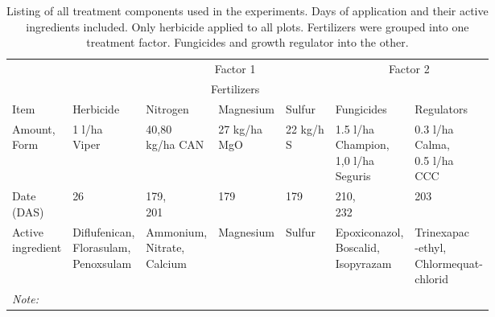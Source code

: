 \documentclass[twoside,12pt,final]{ucthesis-CA2012}
\begin{document}
\begin{ucmainmatter}
\begin{table}
\caption{\label{tab:Trt}Listing of all treatment components used in the experiments. Days of application and their active ingredients included. Only herbicide applied to all plots. Fertilizers were grouped into one treatment factor. Fungicides and growth regulator into the other.}
\centering
\begin{tabular}[t]{lllllll}
\toprule
\multicolumn{2}{c}{ } & \multicolumn{3}{c}{Factor 1} & \multicolumn{2}{c}{Factor 2} \\
\cmidrule(l{3pt}r{3pt}){3-5} \cmidrule(l{3pt}r{3pt}){6-7}
\multicolumn{2}{c}{ } & \multicolumn{3}{c}{Fertilizers} & \multicolumn{2}{c}{ } \\
\cmidrule(l{3pt}r{3pt}){3-5}
Item & Herbicide & Nitrogen & Magnesium & Sulfur & Fungicides & Regulators\\
\midrule
\makecell[l]{Amount,\\Form} & \makecell[l]{1 l/ha\\Viper} & \makecell[l]{40,80\\kg/ha CAN} & \makecell[l]{27 kg/ha\\MgO} & \makecell[l]{22 kg/h\\S} & \makecell[l]{1.5 l/ha\\Champion,\\1,0 l/ha\\Seguris} & \makecell[l]{ 0.3 l/ha\\Calma,\\0.5 l/ha\\CCC}\\
\makecell[l]{Date\\(DAS)} & 26 & \makecell[l]{179,\\201} & 179 & 179 & \makecell[l]{210,\\232} & 203\\
\makecell[l]{Active\\ingredient} & \makecell[l]{Diflufenican,\\Florasulam,\\Penoxsulam} & \makecell[l]{Ammonium,\\Nitrate,\\Calcium} & Magnesium & Sulfur & \makecell[l]{Epoxiconazol,\\Boscalid,\\Isopyrazam} & \makecell[l]{Trinexapac\\-ethyl,\\Chlormequat-\\chlorid}\\
\bottomrule
\multicolumn{7}{l}{\rule{0pt}{1em}\textit{Note: }}\\

\end{tabular}
\end{table}
\end{ucmainmatter}
\end{document}
